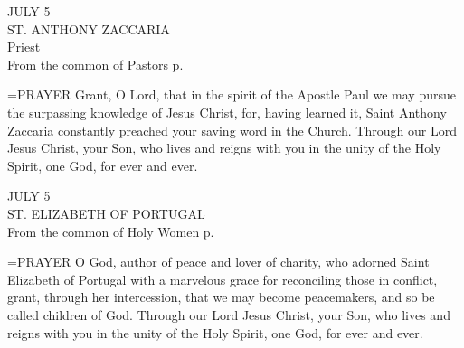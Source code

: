 \begin{center}\normalsize JULY 5\\
\footnotesize ST. ANTHONY ZACCARIA\\
\footnotesize Priest\\
\footnotesize From the common of Pastors p. \\
\end{center}

\hangindent=\parindent \small{PRAYER 
Grant, O Lord, that in the spirit of the Apostle Paul
we may pursue the surpassing knowledge of Jesus Christ,
for, having learned it,
Saint Anthony Zaccaria
constantly preached your saving word in the Church.
Through our Lord Jesus Christ, your Son,
who lives and reigns with you in the unity of the Holy Spirit,
one God, for ever and ever.\\}
 
\begin{center}\normalsize JULY 5\\
\footnotesize ST. ELIZABETH OF PORTUGAL\\
\footnotesize From the common of Holy Women p. \\
\end{center}

\hangindent=\parindent \small{PRAYER 
O God, author of peace and lover of charity,
who adorned Saint Elizabeth of Portugal
with a marvelous grace for reconciling those in conflict,
grant, through her intercession,
that we may become peacemakers,
and so be called children of God.
Through our Lord Jesus Christ, your Son,
who lives and reigns with you in the unity of the Holy Spirit,
one God, for ever and ever.	\\}
 
